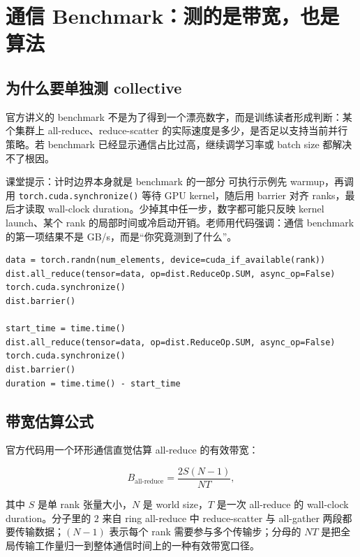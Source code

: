 \documentclass[a4paper]{article}
\newcommand{\code}[1]{\texttt{#1}}
\begin{document}
\section{通信 Benchmark：测的是带宽，也是算法}

\subsection{为什么要单独测 collective}

官方讲义的 benchmark 不是为了得到一个漂亮数字，而是训练读者形成判断：某个集群上 all-reduce、reduce-scatter 的实际速度是多少，是否足以支持当前并行策略。若 benchmark 已经显示通信占比过高，继续调学习率或 batch size 都解决不了根因。

\begin{knowledgebox}{课堂提示：计时边界本身就是 benchmark 的一部分}
可执行示例先 warmup，再调用 \code{torch.cuda.synchronize()} 等待 GPU kernel，随后用 barrier 对齐 ranks，最后才读取 wall-clock duration。少掉其中任一步，数字都可能只反映 kernel launch、某个 rank 的局部时间或冷启动开销。老师用代码强调：通信 benchmark 的第一项结果不是 GB/s，而是“你究竟测到了什么”。
\end{knowledgebox}

\begin{lstlisting}[caption={all-reduce benchmark 的关键步骤}]
data = torch.randn(num_elements, device=cuda_if_available(rank))
dist.all_reduce(tensor=data, op=dist.ReduceOp.SUM, async_op=False)
torch.cuda.synchronize()
dist.barrier()

start_time = time.time()
dist.all_reduce(tensor=data, op=dist.ReduceOp.SUM, async_op=False)
torch.cuda.synchronize()
dist.barrier()
duration = time.time() - start_time
\end{lstlisting}

\subsection{带宽估算公式}

官方代码用一个环形通信直觉估算 all-reduce 的有效带宽：

\[
B_{\text{all-reduce}}
    =
\frac{2S(N-1)}{N T},
\]

其中 \(S\) 是单 rank 张量大小，\(N\) 是 world size，\(T\) 是一次 all-reduce 的 wall-clock duration。分子里的 \(2\) 来自 ring all-reduce 中 reduce-scatter 与 all-gather 两段都要传输数据；\((N-1)\) 表示每个 rank 需要参与多个传输步；分母的 \(N T\) 是把全局传输工作量归一到整体通信时间上的一种有效带宽口径。
\end{document}

